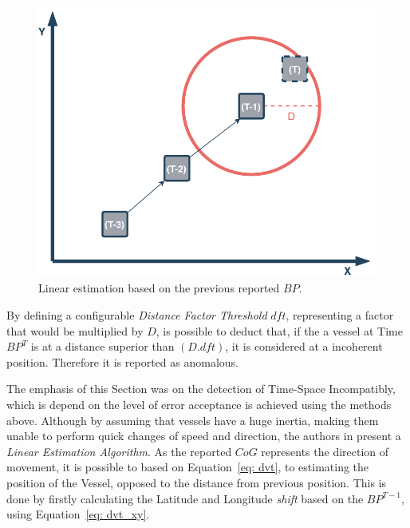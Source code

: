 \begin{figure}[H]
\centering
\includegraphics[scale = .6]{figures/Ch4/DVT.pdf}
\caption{Linear estimation based on the previous reported $BP$.}
\label{fig: dvt}
\end{figure}

By defining a configurable \emph{Distance Factor Threshold} $dft$, representing a factor that would be multiplied by $D$, is possible to deduct that, if the a vessel at Time $BP^{T}$ is at a distance superior than $(D.dft)$, it is considered at a incoherent position. Therefore it is reported as anomalous.

The emphasis of this Section was on the detection of Time-Space Incompatibly, which is depend on the level of error acceptance is achieved using the methods above. 
Although by assuming that vessels have a huge inertia, making them unable to perform quick changes of speed and direction, the authors in \cite{Sadowski2015AlgorithmsCompression} present a \emph{Linear Estimation Algorithm}.
As the reported $CoG$ represents the direction of movement, it is possible to based on Equation~\ref{eq: dvt}, to estimating the position of the Vessel, opposed to the distance from previous position. This is done by firstly calculating the Latitude and Longitude \emph{shift} based on the $BP^{T-1}$, using Equation~\ref{eq: dvt_xy}.

